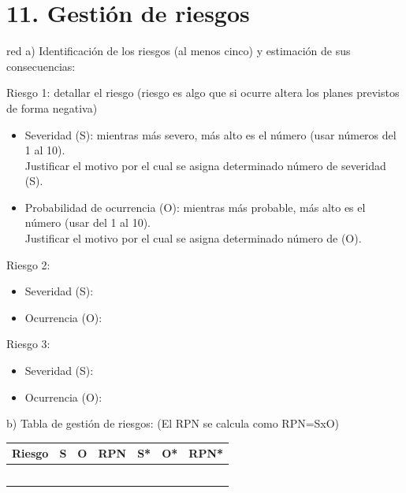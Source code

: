 \documentclass[
11pt, %
]{charter}
\begin{document}
\section{11. Gestión de riesgos}
\label{sec:riesgos}

\begin{consigna}{red}
a) Identificación de los riesgos (al menos cinco) y estimación de sus consecuencias:
 
Riesgo 1: detallar el riesgo (riesgo es algo que si ocurre altera los planes previstos de forma negativa)
\begin{itemize}
	\item Severidad (S): mientras más severo, más alto es el número (usar números del 1 al 10).\\
	Justificar el motivo por el cual se asigna determinado número de severidad (S).
	\item Probabilidad de ocurrencia (O): mientras más probable, más alto es el número (usar del 1 al 10).\\
	Justificar el motivo por el cual se asigna determinado número de (O). 
\end{itemize}   

Riesgo 2:
\begin{itemize}
	\item Severidad (S): 
	\item Ocurrencia (O):
\end{itemize}

Riesgo 3:
\begin{itemize}
	\item Severidad (S): 
	\item Ocurrencia (O):
\end{itemize}


b) Tabla de gestión de riesgos:      (El RPN se calcula como RPN=SxO)

\begin{table}[htpb]
\centering
\begin{tabularx}{\linewidth}{@{}|X|c|c|c|c|c|c|@{}}
\hline
\rowcolor[HTML]{C0C0C0} 
Riesgo & S & O & RPN & S* & O* & RPN* \\ \hline
       &   &   &     &    &    &      \\ \hline
       &   &   &     &    &    &      \\ \hline
       &   &   &     &    &    &      \\ \hline
       &   &   &     &    &    &      \\ \hline
       &   &   &     &    &    &      \\ \hline
\end{tabularx}%
\end{table}


\end{consigna}
\end{document}
